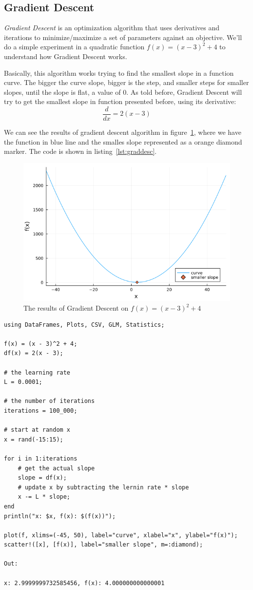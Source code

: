 \documentclass[a4paper, 11pt]{article}
\begin{document}
\subsection{Gradient Descent}
\textit{Gradient Descent} is an optimization algorithm that uses derivatives and iterations to minimize/maximize a set of parameters against an objective. We'll do a simple experiment in a quadratic function $f(x) = (x - 3)^2 + 4$ to understand how Gradient Descent works.

Basically, this algorithm works trying to find the smallest slope in a function curve. The bigger the curve slope, bigger is the step, and smaller steps for smaller slopes, until the slope is flat, a value of 0. As told before, Gradient Descent will try to get the smallest slope in function presented before, using its derivative:
$$
\frac{d}{dx} = 2(x -3)
$$

We can see the results of gradient descent algorithm in figure~\ref{fig:rgdesc}, where we have the function in blue line and the smalles slope represented as a orange diamond marker. The code is shown in listing~\ref{lst:graddesc}.

\begin{figure}[ht]
\caption{The results of Gradient Descent on $f(x) = (x - 3)^2 + 4$}
\label{fig:rgdesc}
\includegraphics[width=.5\textwidth]{gradientdescent}
\centering
\end{figure}

\begin{lstlisting}[label={lst:graddesc},caption={Gradient Descent on $f(x) = (x - 3)^2 + 4$}]
using DataFrames, Plots, CSV, GLM, Statistics;

f(x) = (x - 3)^2 + 4;
df(x) = 2(x - 3);

# the learning rate
L = 0.0001;

# the number of iterations
iterations = 100_000;

# start at random x
x = rand(-15:15);

for i in 1:iterations
	# get the actual slope
	slope = df(x);
	# update x by subtracting the lernin rate * slope
	x -= L * slope;
end
println("x: $x, f(x): $(f(x))");

plot(f, xlims=(-45, 50), label="curve", xlabel="x", ylabel="f(x)");
scatter!([x], [f(x)], label="smaller slope", m=:diamond);

Out:

x: 2.9999999732585456, f(x): 4.000000000000001
\end{lstlisting}
\end{document}
